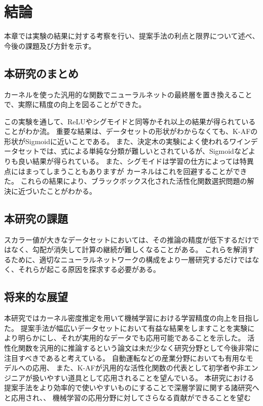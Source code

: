 \chapter{結論}
\label{conclusion}

本章では実験の結果に対する考察を行い、提案手法の利点と限界について述べ、今後の課題及び方針を示す。


\section{本研究のまとめ}

カーネルを使った汎用的な関数でニューラルネットの最終層を置き換えることで、実際に精度の向上を図ることができた。

この実験を通して、ReLUやシグモイドと同等かそれ以上の結果が得られていることがわか流。
重要な結果は、データセットの形状がわからなくても、K-AFの形状がSigmoidに近いことである。 
また、決定木の実験によく使われるワインデータセットでは、式による単純な分類が難しいとされているが、Sigmoidなどよりも良い結果が得られている。
また、シグモイドは学習の仕方によっては特異点にはまってしまうこともありますが カーネルはこれを回避することができた。
これらの結果により、ブラックボックス化された活性化関数選択問題の解決に近づいたことがわかる。




\section{本研究の課題}
スカラー値が大きなデータセットにおいては、その推論の精度が低下するだけではなく、勾配が消失して計算の継続が難しくなることがある。
これらを解消するために、適切なニューラルネットワークの構成をより一層研究するだけではなく、それらが起こる原因を探求する必要がある。



\section{将来的な展望}


本研究ではカーネル密度推定を用いて機械学習における学習精度の向上を目指した。
提案手法が幅広いデータセットにおいて有益な結果をしますことを実験により明らかにし、それが実用的なデータでも応用可能であることを示した。
活性化関数を汎用的に推論するという論文は未だ少なく研究分野として今後非常に注目すべきであると考えている。 
自動運転などの産業分野においても有用なモデルへの応用、
また、K-AFが汎用的な活性化関数の代表として初学者や非エンジニアが扱いやすい道具として応用されることを望んでいる。
本研究における提案手法をより効率的で使いやすいものにすることで深層学習に関する諸研究へと応用され、、 機械学習の応用分野に対してさらなる貢献ができることを望む

